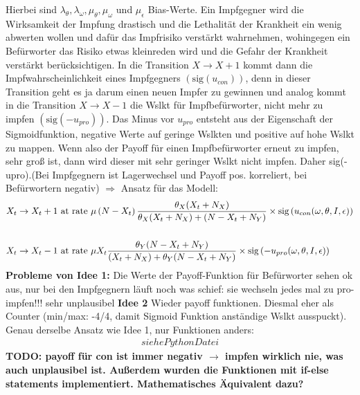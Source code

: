 \documentclass[10pt,a4paper]{article}
\begin{document}
Hierbei sind $\lambda_{\theta}, \lambda_{\omega}, \mu_{\theta}, \mu_{\omega}$ und $\mu_{\epsilon}$ Bias-Werte. Ein Impfgegner wird die Wirksamkeit der Impfung drastisch und die Lethalität der Krankheit ein wenig abwerten wollen und dafür das Impfrisiko verstärkt wahrnehmen, wohingegen ein Befürworter das Risiko etwas kleinreden wird und die Gefahr der Krankheit verstärkt berücksichtigen.\newline
In die Transition $X \rightarrow X + 1$ kommt dann die Impfwahrscheinlichkeit eines Impfgegners $(\mathrm{sig}\left( u_{con}\right))$, denn in dieser Transition geht es ja darum einen neuen Impfer zu gewinnen und analog kommt in die Transition $X \rightarrow X-1$ die Wslkt für Impfbefürworter, nicht mehr zu impfen $(\mathrm{sig}\left( -u_{pro}\right))$.\newline
Das Minus vor $u_{pro}$ entsteht aus der Eigenschaft der Sigmoidfunktion, negative Werte auf geringe Wslkten und positive auf hohe Wslkt zu mappen. Wenn also der Payoff für einen Impfbefürworter erneut zu impfen, sehr groß ist, dann wird dieser mit sehr geringer Wslkt nicht impfen. Daher sig(-upro).(Bei Impfgegnern ist Lagerwechsel und Payoff pos. korreliert, bei Befürwortern negativ)\newline
$\Rightarrow$ Ansatz für das Modell:
\begin{align*}
\begin{split}
X_t \rightarrow X_t + 1 & \textnormal{ at rate } \mu\left(N-X_t\right)\frac{\theta_X (X_t + N_X)}{\theta_X (X_t + N_X) + (N - X_t + N_Y)} \times \mathrm{sig}\left(u_{con}(\omega, \theta, I, \epsilon)\right) \\
&\\
X_t \rightarrow X_t - 1 & \textnormal{ at rate } \mu X_t\frac{\theta_Y(N-X_t+N_Y)}{(X_t + N_X) + \theta_Y(N-X_t+N_Y)} \times \mathrm{sig}\left(- u_{pro}(\omega, \theta, I, \epsilon)\right)
\end{split}
\end{align*}
\textbf{Probleme von Idee 1:}\newline
Die Werte der Payoff-Funktion für Befürworter sehen ok aus, nur bei den Impfgegnern läuft noch was schief: sie wechseln jedes mal zu pro-impfen!!! sehr unplausibel
\newpage
\textbf{Idee 2}\newline
Wieder payoff funktionen. Diesmal eher als Counter (min/max: -4/4, damit Sigmoid Funktion anständige Wslkt ausspuckt). Genau derselbe Ansatz wie Idee 1, nur Funktionen anders:
\begin{align*}
	siehe Python Datei
\end{align*}
\textbf{TODO: payoff für con ist immer negativ $\rightarrow$ impfen wirklich nie, was auch unplausibel ist. Außerdem wurden die Funktionen mit if-else statements implementiert. Mathematisches Äquivalent dazu?}
\end{document}
